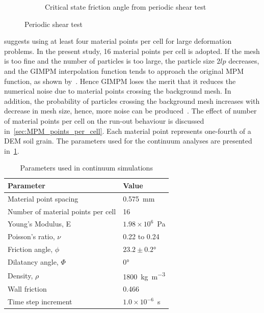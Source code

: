 \begin{figure}
\begin{subfigure}[b]{0.575\textwidth}
\caption{Critical state friction angle from periodic shear test}
\label{fig:Sxy_vs_Syy}
\end{subfigure} 
\caption{Periodic shear test}
\label{fig:shear_test}
\end{figure}

\citet{Guilkey2003} suggests using at least four material points per cell for 
large deformation problems. In the present study, 16 material points 
per cell is adopted. If the mesh is too fine and the number of particles is too 
large, the particle size $2lp$ decreases, and the GIMPM interpolation 
function 
tends to approach the original MPM function, as shown 
by~\citet{Bardenhagen2004}. Hence GIMPM loses the merit that it reduces the 
numerical noise due to material points crossing the background mesh. In 
addition, the probability of particles crossing the background mesh increases 
with decrease in mesh size, hence, more noise can be produced~\cite{Abe2013}. 
The effect of number of material points per cell on the run-out behaviour is 
discussed in~\cref{sec:MPM_points_per_cell}. Each material point represents 
one-fourth of a DEM soil grain. The parameters used for the continuum analyses 
are presented in~\cref{table:MPMData}. 

\begin{table}
\caption{Parameters used in continuum simulations}
\label{table:MPMData}
\centering
\begin{tabular}{ll}
\toprule
\textbf{Parameter} & \textbf{Value} \\ \midrule
Material point spacing & 0.575~\si{\mm} \\
Number of material points per cell & 16 \\
Young's Modulus, E & $1.98 \times 10 ^{6}$~\si{\Pa} \\
Poisson's ratio, $\nu$ & 0.22 to 0.24 \\ 
Friction angle, $\phi$ & $23.2 \pm 0.2\si{\degree}$ \\
Dilatancy angle, $\varPhi$ & $0$\si{\degree} \\
Density, $\rho$ & 1800~\si{\kg\per\m\cubed}\\
Wall friction & 0.466 \\
Time step increment & $1.0 \times 10^{-6}$~\si{\second}\\ \bottomrule
\end{tabular}
\end{table}

